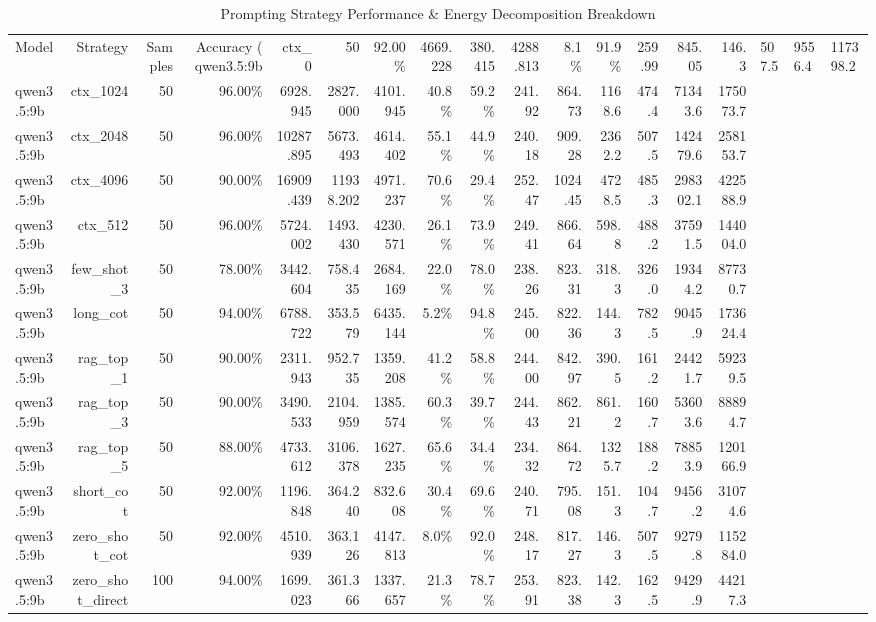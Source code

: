 \begin{table}[t]
\centering
\small
\begin{tabular}{lrrrrrrrrrrrrrr}
\toprule
Model & Strategy & Samples & Accuracy (%
\midrule
qwen3.5:9b & ctx\_0 & 50 & 92.00\% & 4669.228 & 380.415 & 4288.813 & 8.1\% & 91.9\% & 259.99 & 845.05 & 146.3 & 507.5 & 9556.4 & 117398.2 \\
qwen3.5:9b & ctx\_1024 & 50 & 96.00\% & 6928.945 & 2827.000 & 4101.945 & 40.8\% & 59.2\% & 241.92 & 864.73 & 1168.6 & 474.4 & 71343.6 & 175073.7 \\
qwen3.5:9b & ctx\_2048 & 50 & 96.00\% & 10287.895 & 5673.493 & 4614.402 & 55.1\% & 44.9\% & 240.18 & 909.28 & 2362.2 & 507.5 & 142479.6 & 258153.7 \\
qwen3.5:9b & ctx\_4096 & 50 & 90.00\% & 16909.439 & 11938.202 & 4971.237 & 70.6\% & 29.4\% & 252.47 & 1024.45 & 4728.5 & 485.3 & 298302.1 & 422588.9 \\
qwen3.5:9b & ctx\_512 & 50 & 96.00\% & 5724.002 & 1493.430 & 4230.571 & 26.1\% & 73.9\% & 249.41 & 866.64 & 598.8 & 488.2 & 37591.5 & 144004.0 \\
qwen3.5:9b & few\_shot\_3 & 50 & 78.00\% & 3442.604 & 758.435 & 2684.169 & 22.0\% & 78.0\% & 238.26 & 823.31 & 318.3 & 326.0 & 19344.2 & 87730.7 \\
qwen3.5:9b & long\_cot & 50 & 94.00\% & 6788.722 & 353.579 & 6435.144 & 5.2\% & 94.8\% & 245.00 & 822.36 & 144.3 & 782.5 & 9045.9 & 173624.4 \\
qwen3.5:9b & rag\_top\_1 & 50 & 90.00\% & 2311.943 & 952.735 & 1359.208 & 41.2\% & 58.8\% & 244.00 & 842.97 & 390.5 & 161.2 & 24421.7 & 59239.5 \\
qwen3.5:9b & rag\_top\_3 & 50 & 90.00\% & 3490.533 & 2104.959 & 1385.574 & 60.3\% & 39.7\% & 244.43 & 862.21 & 861.2 & 160.7 & 53603.6 & 88894.7 \\
qwen3.5:9b & rag\_top\_5 & 50 & 88.00\% & 4733.612 & 3106.378 & 1627.235 & 65.6\% & 34.4\% & 234.32 & 864.72 & 1325.7 & 188.2 & 78853.9 & 120166.9 \\
qwen3.5:9b & short\_cot & 50 & 92.00\% & 1196.848 & 364.240 & 832.608 & 30.4\% & 69.6\% & 240.71 & 795.08 & 151.3 & 104.7 & 9456.2 & 31074.6 \\
qwen3.5:9b & zero\_shot\_cot & 50 & 92.00\% & 4510.939 & 363.126 & 4147.813 & 8.0\% & 92.0\% & 248.17 & 817.27 & 146.3 & 507.5 & 9279.8 & 115284.0 \\
qwen3.5:9b & zero\_shot\_direct & 100 & 94.00\% & 1699.023 & 361.366 & 1337.657 & 21.3\% & 78.7\% & 253.91 & 823.38 & 142.3 & 162.5 & 9429.9 & 44217.3 \\
\bottomrule
\end{tabular}
\caption{Prompting Strategy Performance & Energy Decomposition Breakdown}
\label{tab:2_strategy_comparison}
\end{table}
